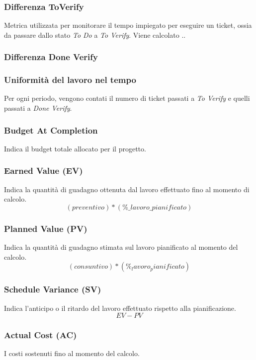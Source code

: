 \subsubsection{Differenza ToVerify}
Metrica utilizzata per monitorare il tempo impiegato per eseguire un ticket, ossia da passare dallo stato \textit{To Do} a \textit{To Verify}. Viene calcolato ..

\subsubsection{Differenza Done Verify}

\subsubsection{Uniformità del lavoro nel tempo}
Per ogni periodo, vengono contati il numero di ticket passati a \textit{To Verify} e quelli passati a \textit{Done Verify}.

\subsubsection{Budget At Completion}
Indica il budget totale allocato per il progetto.

\subsubsection{Earned Value (EV)}
Indica la quantità di guadagno ottenuta dal lavoro effettuato fino al momento di calcolo.
\[
    (preventivo)*(\%\_lavoro\_pianificato)
\]

\subsubsection{Planned Value (PV)}
Indica la quantità di guadagno stimata sul lavoro pianificato al momento del calcolo.
\[
    (consuntivo)*(\%_lavoro_pianificato)
\]

\subsubsection{Schedule Variance (SV)}
Indica l'anticipo o il ritardo del lavoro effettuato rispetto alla pianificazione.
\[
    EV - PV
\]

\subsubsection{Actual Cost (AC)}
I costi sostenuti fino al momento del calcolo.

